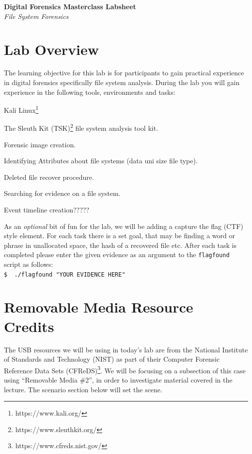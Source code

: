 \documentclass[a4paper,11pt]{article}
\author{Fraser Brown}
\date{\today}
\begin{document}
\begin{titlepage}
   \begin{center}
      \Large\textbf{Digital Forensics Masterclass Labsheet}\\
      \large\textit{File System Forensics}
   \end{center}
\end{titlepage}

\tableofcontents
\newpage

\section{Lab Overview}
The learning objective for this lab is for participants to gain practical experience in digital forensics specifically file system analysis. During the lab you will gain experience in the following tools, environments and tasks:
\begin{itemize*}
	\item Kali Linux\footnote{https://www.kali.org/}
	\item The Sleuth Kit (TSK)\footnote{https://www.sleuthkit.org/} file system analysis tool kit.
	\item Forensic image creation.
	\item Identifying Attributes about file systems (data uni size file type).
	\item Deleted file recover procedure.
	\item Searching for evidence on a file system.
	\item Event timeline creation?????
\end{itemize*}

As an \textit{optional} bit of fun for the lab, we will be adding a capture the flag (CTF) style element. For each task there is a set goal, that may be finding a word or phrase in unallocated space, the hash of a recovered file etc. After each task is completed please enter the given evidence as an argument to the \texttt{flagfound} script as follows:\\
\verb|$  ./flagfound "YOUR EVIDENCE HERE"|


\section{Removable Media Resource Credits}
The USB resources we will be using in today's lab are from the National Institute of Standards and Technology (NIST) as part of their Computer Forensic Reference Data Sets (CFReDS)\footnote{https://www.cfreds.nist.gov/}.  We will be focusing on a subsection of this case using ``Removable Media {\#}2'', in order to investigate material covered in the lecture. The scenario section below will set the scene. 
 
\end{document}
